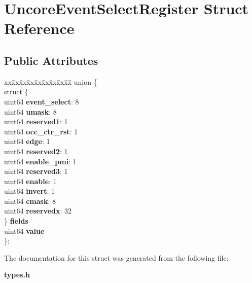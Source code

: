 \section{Uncore\+Event\+Select\+Register Struct Reference}
\label{structUncoreEventSelectRegister}
\subsection*{Public Attributes}
\begin{DoxyCompactItemize}
\item 
\mbox{\label{structUncoreEventSelectRegister_ac9ca584a25b24d84bcea2eebfebe475d}} 
\begin{tabbing}
xx\=xx\=xx\=xx\=xx\=xx\=xx\=xx\=xx\=\kill
union \{\\
\>struct \{\\
\>\>uint64 {\bfseries event\_select}: 8\\
\>\>uint64 {\bfseries umask}: 8\\
\>\>uint64 {\bfseries reserved1}: 1\\
\>\>uint64 {\bfseries occ\_ctr\_rst}: 1\\
\>\>uint64 {\bfseries edge}: 1\\
\>\>uint64 {\bfseries reserved2}: 1\\
\>\>uint64 {\bfseries enable\_pmi}: 1\\
\>\>uint64 {\bfseries reserved3}: 1\\
\>\>uint64 {\bfseries enable}: 1\\
\>\>uint64 {\bfseries invert}: 1\\
\>\>uint64 {\bfseries cmask}: 8\\
\>\>uint64 {\bfseries reservedx}: 32\\
\>\} {\bfseries fields}\\
\>uint64 {\bfseries value}\\
\}; \\

\end{tabbing}\end{DoxyCompactItemize}


The documentation for this struct was generated from the following file\+:\begin{DoxyCompactItemize}
\item 
\textbf{ types.\+h}\end{DoxyCompactItemize}
